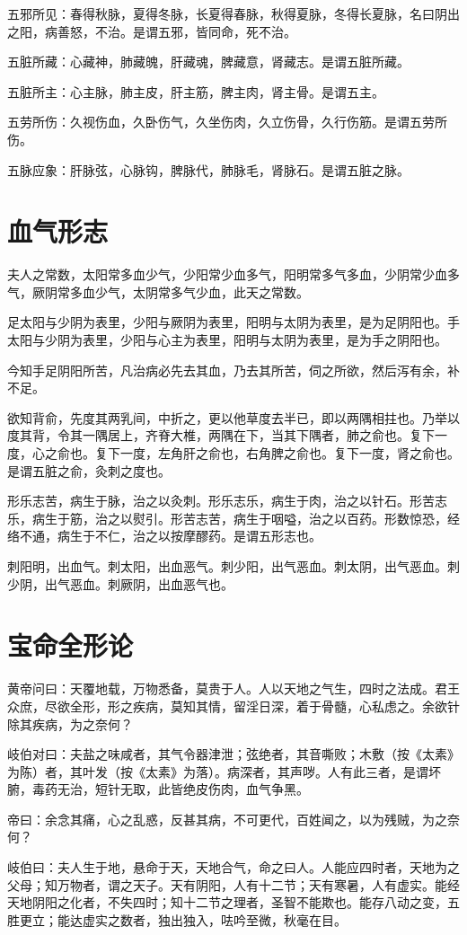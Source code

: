 \documentclass{article}%
\begin{document}
五邪所见：春得秋脉，夏得冬脉，长夏得春脉，秋得夏脉，冬得长夏脉，名曰阴出之阳，病善怒，不治。是谓五邪，皆同命，死不治。

五脏所藏：心藏神，肺藏魄，肝藏魂，脾藏意，肾藏志。是谓五脏所藏。

五脏所主：心主脉，肺主皮，肝主筋，脾主肉，肾主骨。是谓五主。

五劳所伤：久视伤血，久卧伤气，久坐伤肉，久立伤骨，久行伤筋。是谓五劳所伤。

五脉应象：肝脉弦，心脉钩，脾脉代，肺脉毛，肾脉石。是谓五脏之脉。
\section{血气形志}
夫人之常数，太阳常多血少气，少阳常少血多气，阳明常多气多血，少阴常少血多气，厥阴常多血少气，太阴常多气少血，此天之常数。

足太阳与少阴为表里，少阳与厥阴为表里，阳明与太阴为表里，是为足阴阳也。手太阳与少阴为表里，少阳与心主为表里，阳明与太阴为表里，是为手之阴阳也。

今知手足阴阳所苦，凡治病必先去其血，乃去其所苦，伺之所欲，然后泻有余，补不足。

欲知背俞，先度其两乳间，中折之，更以他草度去半已，即以两隅相拄也。乃举以度其背，令其一隅居上，齐脊大椎，两隅在下，当其下隅者，肺之俞也。复下一度，心之俞也。复下一度，左角肝之俞也，右角脾之俞也。复下一度，肾之俞也。是谓五脏之俞，灸刺之度也。

形乐志苦，病生于脉，治之以灸刺。形乐志乐，病生于肉，治之以针石。形苦志乐，病生于筋，治之以熨引。形苦志苦，病生于咽嗌，治之以百药。形数惊恐，经络不通，病生于不仁，治之以按摩醪药。是谓五形志也。

刺阳明，出血气。刺太阳，出血恶气。刺少阳，出气恶血。刺太阴，出气恶血。刺少阴，出气恶血。刺厥阴，出血恶气也。
\section{宝命全形论}
黄帝问曰：天覆地载，万物悉备，莫贵于人。人以天地之气生，四时之法成。君王众庶，尽欲全形，形之疾病，莫知其情，留淫日深，着于骨髓，心私虑之。余欲针除其疾病，为之奈何？

岐伯对曰：夫盐之味咸者，其气令器津泄；弦绝者，其音嘶败；木敷（按《太素》为陈）者，其叶发（按《太素》为落）。病深者，其声哕。人有此三者，是谓坏腑，毒药无治，短针无取，此皆绝皮伤肉，血气争黑。

帝曰：余念其痛，心之乱惑，反甚其病，不可更代，百姓闻之，以为残贼，为之奈何？

岐伯曰：夫人生于地，悬命于天，天地合气，命之曰人。人能应四时者，天地为之父母；知万物者，谓之天子。天有阴阳，人有十二节；天有寒暑，人有虚实。能经天地阴阳之化者，不失四时；知十二节之理者，圣智不能欺也。能存八动之变，五胜更立；能达虚实之数者，独出独入，呿吟至微，秋毫在目。
\end{document}
